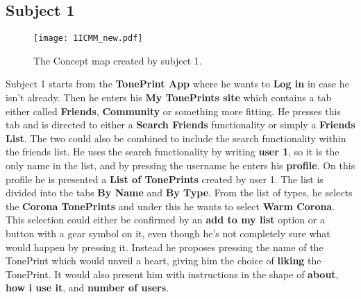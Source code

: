 
\subsection*{Subject 1}
\label{Subject1}
%
\begin{figure}[H]
	\centering
	\texttt{[image: 1ICMM\_new.pdf]}
	\caption{The Concept map created by subject 1.}
	\label{fig:ICMM1}
\end{figure}
%
Subject 1 starts from the \textbf{TonePrint App} where he wants to \textbf{Log in} in case he isn't already. Then he enters his \textbf{My TonePrints site} which contains a tab either called \textbf{Friends}, \textbf{Community} or something more fitting. He presses this tab and is directed to either a \textbf{Search Friends} functionality or simply a \textbf{Friends List}. The two could also be combined to include the search functionality within the friends list. He uses the search functionality by writing \textbf{user 1}, so it is the only name in the list, and by pressing the username he enters his \textbf{profile}. On this profile he is presented a \textbf{List of TonePrints} created by user 1. The list is divided into the tabs \textbf{By Name} and \textbf{By Type}. From the list of types, he selects the \textbf{Corona TonePrints} and under this he wants to select \textbf{Warm Corona}. This selection could either be confirmed by an \textbf{add to my list} option or a button with a gear symbol on it, even though he's not completely sure what would happen by pressing it. Instead he proposes pressing the name of the TonePrint which would unveil a heart, giving him the choice of \textbf{liking} the TonePrint. It would also present him with instructions in the shape of \textbf{about}, \textbf{how i use it}, and \textbf{number of users}.\\
%
